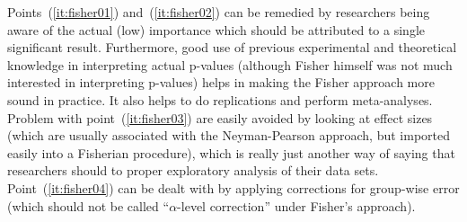 Points~(\ref{it:fisher01}) and~(\ref{it:fisher02}) can be remedied by researchers being aware of the actual (low) importance which should be attributed to a single significant result.
Furthermore, good use of previous experimental and theoretical knowledge in interpreting actual p-values (although Fisher himself was not much interested in interpreting p-values) helps in making the Fisher approach more sound in practice.
It also helps to do replications and perform meta-analyses.
Problem with point~(\ref{it:fisher03}) are easily avoided by looking at effect sizes (which are usually associated with the Neyman-Pearson approach, but imported easily into a Fisherian procedure), which is really just another way of saying that researchers should to proper exploratory analysis of their data sets.
Point~(\ref{it:fisher04}) can be dealt with by applying corrections for group-wise error (which should not be called ``$\alpha$-level correction'' under Fisher's approach).

